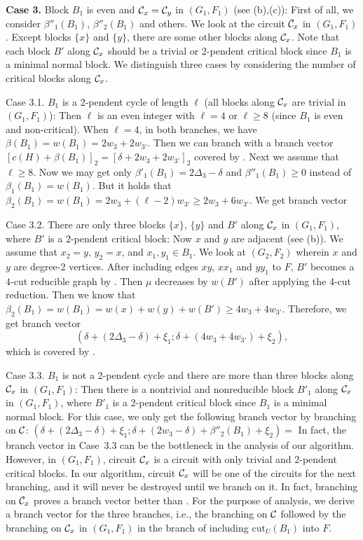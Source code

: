 \documentclass[runningheads]{llncs}
\begin{document}
{\bf Case 3.} Block $B_1$ is even and ${\cal C}_x={\cal C}_y$ in $(G_1,F_1)$ (see (b),(c)):
 First of all, we consider $\beta''_1(B_1)$, $\beta''_2(B_1)$ and others.
We look at the circuit ${\cal C}_x$ in $(G_1,F_1)$.
 Except blocks $\{x\}$ and $\{y\}$, there are some other blocks along ${\cal C}_x$.
Note that each block $B'$ along ${\cal C}_x$ should be a trivial or 2-pendent critical block since $B_1$ is a minimal normal block.
We distinguish three cases by considering the number of critical blocks along ${\cal C}_x$.

Case 3.1. $B_1$ is a 2-pendent cycle of length $\ell$ (all blocks along ${\cal C}_x$ are trivial in $(G_1,F_1)$):
Then $\ell$ is an even integer with $\ell=4$ or $\ell\geq 8$   (since $B_1$ is even and non-critical). When $\ell=4$, in both branches, we have
$\beta(B_1)=w(B_1)=2w_3+2w_{3'}$.
Then we can branch with a branch vector $[c(H)+\beta(B_1)]_2=[\delta+2w_3+2w_{3'}]_2$  covered by .
Next we assume that $\ell\geq 8$.
Now we may  get only $\beta'_1(B_1)=2\Delta_3-\delta$ and $\beta''_1(B_1)\geq 0$ instead of $\beta_1(B_1)=w(B_1)$.
 But it holds that $\beta_2(B_1)=w(B_1)=2w_3+(\ell-2)w_{3'}\geq 2w_3+6 w_{3'}$.
We get branch vector



Case 3.2. There are only three blocks $\{x\}$, $\{y\}$ and $B'$ along ${\cal C}_x$ in  $(G_1,F_1)$,
where $B'$ is a 2-pendent critical block:
Now $x$ and $y$ are adjacent (see (b)). We assume that $x_2=y$, $y_2=x$, and $x_1,y_1\in B_1$.
We look at $(G_2,F_2)$ wherein $x$ and $y$ are degree-2 vertices.
After including edges $xy$, $xx_1$ and $yy_1$ to $F$,
$B'$ becomes a $4$-cut reducible graph by .
Then $\mu$ decreases by $w(B')$
after applying the 4-cut reduction. Then we know that $\beta_2(B_1)=w(B_1)=w(x)+w(y)+w(B')\geq 4w_3+4w_{3'}$.
Therefore, we get branch vector
\[ (\delta+(2\Delta_3-\delta)+\xi_1; \delta+(4w_3+4w_{3'})+\xi_2),\]
which is covered by .

Case 3.3. $B_1$ is not a 2-pendent cycle and there are more than three blocks along ${\cal C}_x$ in  $(G_1,F_1)$:
Then there is a nontrivial and nonreducible block $B'_1$ along ${\cal C}_x$ in  $(G_1,F_1)$, where
 $B'_1$ is a 2-pendent critical block since $B_1$ is a minimal normal block.
For this case, we only get the following branch vector by branching on ${\cal C}$:
$(\delta+(2\Delta_3-\delta)+\xi_1; \delta+(2w_3-\delta)+\beta''_2(B_1)+\xi_2)=$
In fact, the branch vector  in Case~3.3 can be the bottleneck in the analysis of our algorithm.
However, in $(G_1,F_1)$, circuit ${\cal C}_x$ is a circuit with only trivial and 2-pendent critical blocks.
In our algorithm, circuit ${\cal C}_x$ will be one of the circuits for the next branching,
and it will never be destroyed until we branch on it.
In fact,  branching on ${\cal C}_x$ proves a  branch vector better than .
For the purpose of analysis, we derive a branch vector for the three branches, i.e.,
 the branching on ${\cal C}$ followed by  the branching on
${\cal C}_x$ in $(G_1,F_1)$ in the branch of including $\mathrm{cut}_U(B_1)$  into $F$.
\end{document}

